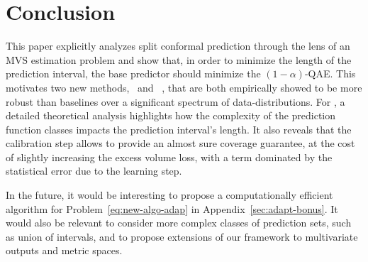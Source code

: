\section{Conclusion}

This paper explicitly analyzes split conformal prediction through the lens of an MVS estimation problem and show that, in order to minimize the length of the prediction interval, the base predictor should minimize the $(1-\alpha)$-QAE. This motivates two new methods, \method~and \methodAD~, that are both empirically showed to be more robust than baselines over a significant spectrum of data-distributions. For \method, a detailed theoretical analysis highlights how the complexity of the prediction function classes impacts the prediction interval's length. It also reveals that the calibration step allows to provide an almost sure coverage guarantee, at the cost of slightly increasing the excess volume loss, with a term dominated by the statistical error due to the learning step.

In the future, it would be interesting to propose a computationally efficient algorithm for Problem~\eqref{eq:new-algo-adap} in Appendix~\ref{sec:adapt-bonus}. It would also be relevant to consider more complex classes of prediction sets, such as union of intervals, and to propose extensions of our framework to multivariate outputs and metric spaces. 


